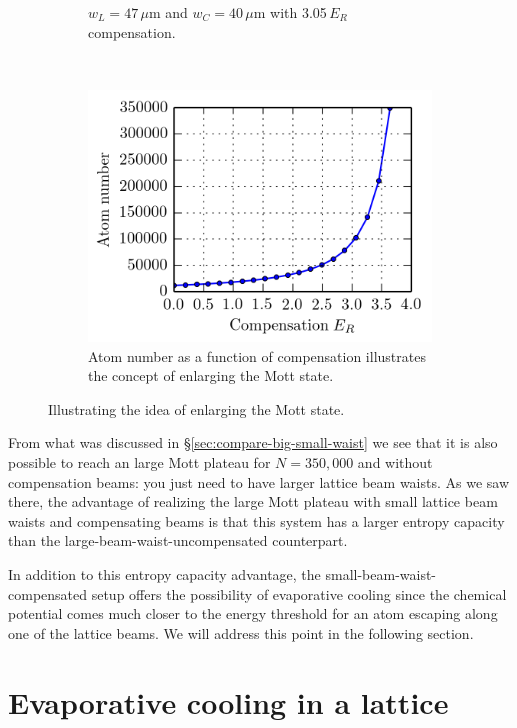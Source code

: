 \documentclass[11pt,letter]{article}
\begin{document}
\begin{figure}
\begin{subfigure}[t]{0.32\textwidth}
\caption{$w_{L}=47\,\mu$m and $w_{C}=40\,\mu$m with 3.05\,$E_{R}$ compensation.  }
                \label{fig:HTSE_enlarge-mott_b}
        \end{subfigure}
        ~        
        \begin{subfigure}[t]{0.32\textwidth}
                \includegraphics[width=\textwidth]{figures/enlarging_mott_state.png}
\caption{Atom number as a function of compensation illustrates the concept of enlarging the Mott state. }
                \label{fig:HSTE_enlarge-mott_c}
        \end{subfigure}
	\caption{  Illustrating the idea of enlarging the Mott state. 
}
\label{fig:HTSE_enlarge-mott}
\end{figure}


From what was discussed in \S\ref{sec:compare-big-small-waist}  we see that it
is also possible to reach an large Mott plateau for $N=350,000$ and without
compensation beams:  you just need to have larger lattice beam waists.  As we
saw there, the advantage of realizing the large Mott plateau with small lattice
beam waists and compensating beams is  that this system has a larger entropy
capacity  than the large-beam-waist-uncompensated counterpart.   

In addition to this entropy capacity advantage, the
small-beam-waist-compensated setup offers the possibility of evaporative
cooling since the chemical potential comes much closer to the energy threshold
for an atom escaping along one of the lattice beams.  We will address this
point in the following section.  


\section{ Evaporative cooling in a lattice }
\end{document}
